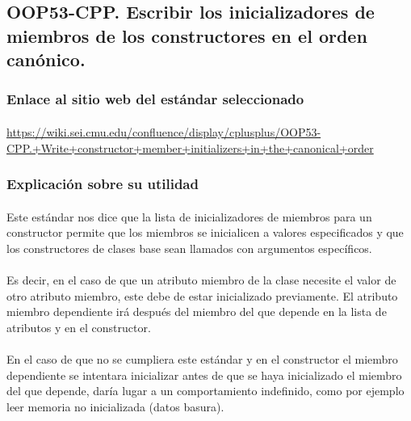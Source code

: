	\subsection{OOP53-CPP. Escribir los inicializadores de miembros de los constructores en el orden canónico.}
	
		\subsubsection{Enlace al sitio web del estándar seleccionado}
		
			\paragraph{}\url{https://wiki.sei.cmu.edu/confluence/display/cplusplus/OOP53-CPP.+Write+constructor+member+initializers+in+the+canonical+order}
		
		\subsubsection{Explicación sobre su utilidad}
		
			\paragraph{}Este estándar nos dice que la lista de inicializadores de miembros para un constructor permite que los miembros se inicialicen a valores especificados y que los constructores de clases base sean llamados con argumentos específicos.
			
			\paragraph{}Es decir, en el caso de que un atributo miembro de la clase necesite el valor de otro atributo miembro, este debe de estar inicializado previamente. El atributo miembro dependiente irá después del miembro del que depende en la lista de atributos y en el constructor.
			
			\paragraph{}En el caso de que no se cumpliera este estándar y en el constructor el miembro dependiente se intentara inicializar antes de que se haya inicializado el miembro del que depende, daría lugar a un comportamiento indefinido, como por ejemplo leer memoria no inicializada (datos basura).
			
